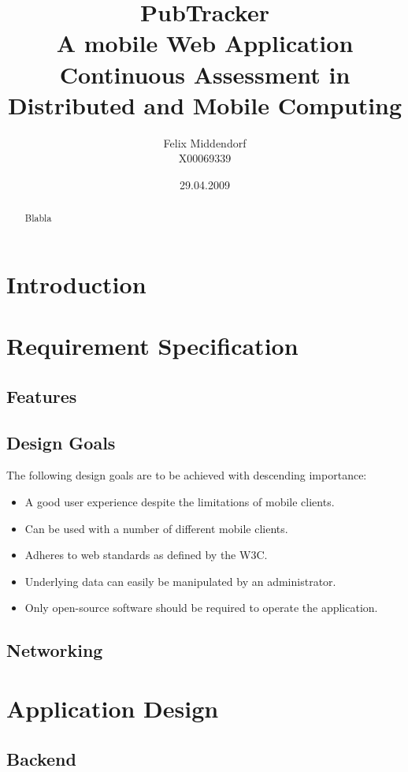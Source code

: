 \documentclass[a4paper,10pt]{scrartcl}
\title{PubTracker\\A mobile Web Application\\{\small Continuous Assessment in Distributed and Mobile Computing}}
\author{Felix Middendorf\\{\small X00069339}}
\date{29.04.2009}
\begin{document}
\maketitle
\begin{abstract}
	Blabla
\end{abstract}
\tableofcontents
\newpage


\section{Introduction}

\section{Requirement Specification}

\subsection{Features}

\subsection{Design Goals}
The following design goals are to be achieved with descending importance:
\begin{itemize}
	\item A good user experience despite the limitations of mobile clients.
	\item Can be used with a number of different mobile clients.
	\item Adheres to web standards as defined by the \ac{W3C}.
	\item Underlying data can easily be manipulated by an administrator.
 	\item Only open-source software should be required to operate the application.
\end{itemize}

\subsection{Networking}

\section{Application Design}
\subsection{Backend}
\end{document}
